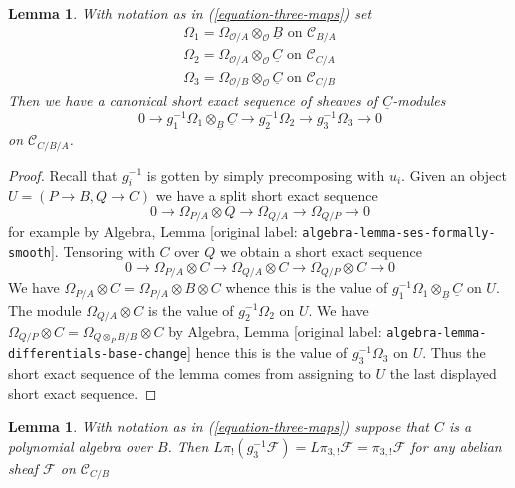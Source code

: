 \documentclass[10pt,a4paper]{article}
\theoremstyle{plain}
\newtheorem{lemma}[subsection]{Lemma}
\theoremstyle{definition}
\theoremstyle{remark}
\numberwithin{equation}{subsection}
\begin{document}
\begin{lemma}
\label{lemma-triangle-ses}
With notation as in (\ref{equation-three-maps}) set
$$
\begin{matrix}
\Omega_1 = \Omega_{\mathcal{O}/A} \otimes_\mathcal{O} \underline{B}
\text{ on }\mathcal{C}_{B/A} \\
\Omega_2 = \Omega_{\mathcal{O}/A} \otimes_\mathcal{O} \underline{C}
\text{ on }\mathcal{C}_{C/A} \\
\Omega_3 = \Omega_{\mathcal{O}/B} \otimes_\mathcal{O} \underline{C}
\text{ on }\mathcal{C}_{C/B}
\end{matrix}
$$
Then we have a canonical short exact sequence of sheaves
of $\underline{C}$-modules
$$
0 \to g_1^{-1}\Omega_1 \otimes_{\underline{B}} \underline{C} \to
g_2^{-1}\Omega_2 \to
g_3^{-1}\Omega_3 \to 0
$$
on $\mathcal{C}_{C/B/A}$.
\end{lemma}

\begin{proof}
Recall that $g_i^{-1}$ is gotten by simply precomposing with $u_i$.
Given an object $U = (P \to B, Q \to C)$ we have a split
short exact sequence
$$
0 \to \Omega_{P/A} \otimes Q \to \Omega_{Q/A} \to \Omega_{Q/P} \to 0
$$
for example by Algebra, Lemma \textnormal{[original label: \nolinkurl{algebra-lemma-ses-formally-smooth}]}.
Tensoring with $C$ over $Q$ we obtain a short exact sequence
$$
0 \to \Omega_{P/A} \otimes C \to \Omega_{Q/A} \otimes C \to
\Omega_{Q/P} \otimes C \to 0
$$
We have $\Omega_{P/A} \otimes C = \Omega_{P/A} \otimes B \otimes C$
whence this is the value of
$g_1^{-1}\Omega_1 \otimes_{\underline{B}} \underline{C}$
on $U$. The module $\Omega_{Q/A} \otimes C$ is the value of
$g_2^{-1}\Omega_2$ on $U$.
We have $\Omega_{Q/P} \otimes C = \Omega_{Q \otimes_P B/B} \otimes C$
by Algebra, Lemma \textnormal{[original label: \nolinkurl{algebra-lemma-differentials-base-change}]}
hence this is the value of
$g_3^{-1}\Omega_3$ on $U$. Thus the short exact sequence of the
lemma comes from assigning to $U$ the last displayed short exact
sequence.
\end{proof}

\begin{lemma}
\label{lemma-polynomial-on-top}
With notation as in (\ref{equation-three-maps})
suppose that $C$ is a polynomial algebra over $B$. Then
$L\pi_!(g_3^{-1}\mathcal{F}) = L\pi_{3, !}\mathcal{F} = \pi_{3, !}\mathcal{F}$
for any abelian sheaf $\mathcal{F}$ on $\mathcal{C}_{C/B}$
\end{lemma}
\end{document}
